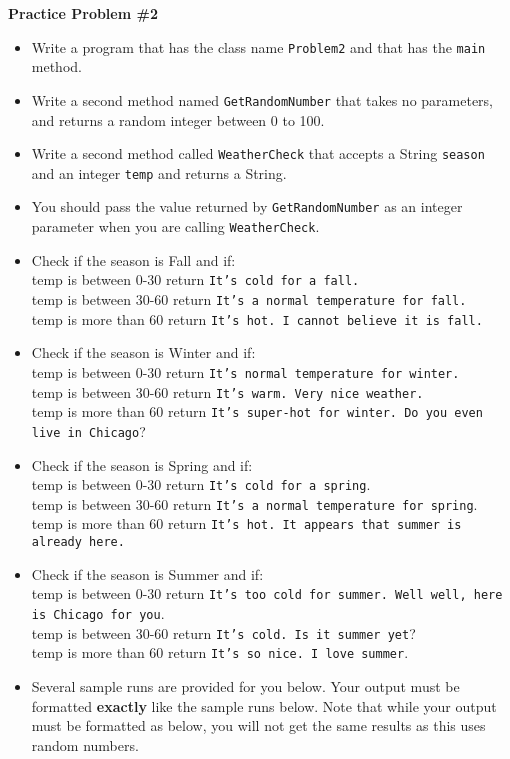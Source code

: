 \documentclass[12pt]{article}
\begin{document}
\vspace*{0.5cm}
\noindent\textbf{Practice Problem \#2}
\begin{itemize}
	\item Write a program that has the class name \texttt{Problem2} and that has the \texttt{main} method.
	\item Write a second method named \texttt{GetRandomNumber} that takes no parameters, and returns a random integer between 0 to 100.
	\item Write a second method called \texttt{WeatherCheck} that accepts a String \texttt{season} and  an integer \texttt{temp} and returns a String.
	\item You should pass the value returned by \texttt{GetRandomNumber} as an integer parameter when you are calling \texttt{WeatherCheck}.
	\item Check if the season is Fall and if:\\
	temp is between 0-30 return \texttt{It's cold for a fall.}\\
	temp is between 30-60 return \texttt{It's a normal temperature for fall.}\\
	temp is more than 60 return \texttt{It's hot. I cannot believe it is fall.}

	\item Check if the season is Winter and if:\\
	temp is between 0-30 return \texttt{It's normal temperature for winter.}\\
	temp is between 30-60 return \texttt{It's warm. Very nice weather.}\\
	temp is more than 60 return \texttt{It's super-hot for winter. Do you even live in Chicago}?

	\item Check if the season is Spring and if:\\
	temp is between 0-30 return \texttt{It's cold for a spring}.\\
	temp is between 30-60 return \texttt{It's a normal temperature for spring}.\\
	temp is more than 60 return \texttt{It's hot. It appears that summer is already here.}

	\item Check if the season is Summer and if:\\
	temp is between 0-30 return \texttt{It's too cold for summer. Well well, here is Chicago for you}.\\
	temp is between 30-60 return \texttt{It's cold. Is it summer yet}?\\
	temp is more than 60 return \texttt{It's so nice. I love summer}.
	\item Several sample runs are provided for you below. Your output must be formatted \textbf{exactly} like the sample runs below. Note that while your output must be formatted as below, you will not get the same results as this uses random numbers.

\end{itemize}
\end{document}
